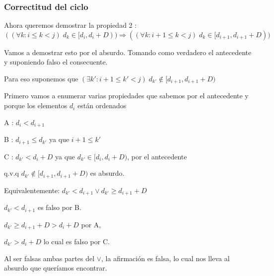 \subsubsection{Correctitud del ciclo}

Ahora queremos demostrar la propiedad 2 : $((\forall k: i \leq k < j)\;d_k \in [d_i, d_i + D)) \Rightarrow ((\forall k: i + 1 \leq k < j)\;d_k \in [d_{i+1}, d_{i+1} + D))$

Vamos a demostrar esto por el absurdo. Tomando como verdadero el antecedente y suponiendo falso el consecuente.

Para eso suponemos que $(\exists k': i+1\leq k' < j) \;d_{k'} \notin [d_{i+1}, d_{i+1} + D) $

Primero vamos a enumerar varias propiedades que sabemos por el antecedente y porque los elementos $d_i$ están ordenados

A : $d_i < d_{i+1}$

B : $d_{i+1} \leq d_{k'}$ ya que $i+1 \leq k'$

C : $d_{k'} < d_i +D$ ya que $d_{k'} \in [d_i,d_i +D)$, por el antecedente

q.v.q $d_{k'} \notin [d_{i+1}, d_{i+1} + D)$ es absurdo.

Equivalentemente: $d_{k'} < d_{i+1} \vee d_{k'} \geq d_{i+1} + D $ 

$d_{k'} < d_{i+1}$ es falso por B.

$d_{k'} \geq d_{i+1} + D  > d_i + D$ por A,

$d_{k'} > d_i + D$ lo cual es falso por C.

Al ser falsas ambas partes del $\vee$, la afirmación es falsa, lo cual nos lleva al absurdo que queríamos encontrar.

